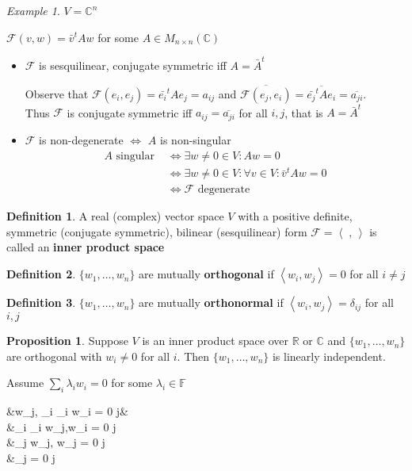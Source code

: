 \documentclass[11pt, a4paper]{report}
\makeatletter
\numberwithin{equation}{section}
\newcommand{\R}{\mathbb{R}}
\newcommand{\C}{\mathbb{C}}
\newcommand{\F}{\mathbb{F}}
\newcommand{\Fc}{\mathcal{F}}
\newcommand{\spn}[1]{\left\langle #1 \right\rangle}
\numberwithin{equation}{subsection}
\theoremstyle{plain}
\theoremstyle{definition}
\newtheorem{defn}{Definition}[chapter]
\newtheorem{prop}[thm]{Proposition}
\theoremstyle{remark}
\newtheorem{exmp}{Example}[chapter]
\newtheorem*{prf}{Proof}
\renewenvironment{prf}[1][\proofname]{\par
  \vspace{-\topsep}%
  \normalfont
  \topsep0pt \partopsep0pt %
  \trivlist
  \item[\hskip\labelsep
        \itshape
    #1\@addpunct{.}]\ignorespaces
}{%
  \popQED\endtrivlist\@endpefalse
  \addvspace{6pt plus 6pt} %
}
\newcommand{\pr}[1]{\begin{adjustwidth}{1cm}{} \begin{prf} #1 \end{prf} \end{adjustwidth}}
\makeatother
\begin{document}
\begin{exmp}
$V = \C^n$

$\Fc(v,w) = \bar{v}^tAw$ for some $A \in M_{n \times n}(\C)$
\begin{itemize}
\item $\Fc$ is sesquilinear, conjugate symmetric iff $A = \bar{A}^t$

Observe that $\Fc(e_i,e_j) = \bar{e_i}^t A e_j = a_{ij}$ and $\overline{\Fc(e_j,e_i)} = \overline{\bar{e_j}^t A e_i} = \overline{a_{ji}}$.\\ Thus $\Fc$ is conjugate symmetric iff $a_{ij} = \overline{a_{ji}}$ for all $i,j$, that is $A = \bar{A}^t$

\item $\Fc$ is non-degenerate $\iff$ $A$ is non-singular
\begin{align*}
A \text{ singular }	&\iff \exists w \neq 0 \in V : Aw = 0\\
					&\iff \exists w \neq 0 \in V : \forall v \in V : \bar{v}^tAw = 0\\
					&\iff \Fc \text{ degenerate }
\end{align*}
\end{itemize}
\end{exmp}

\begin{defn}
A real (complex) vector space $V$ with a positive definite, symmetric (conjugate symmetric), bilinear (sesquilinear) form $\Fc = \spn{\;,\,}$ is called an \textbf{inner product space}
\end{defn}

\begin{defn} 
$\{ w_1, \ldots, w_n \}$ are mutually \textbf{orthogonal} if $\spn{w_i,w_j} = 0$ for all $i \neq j$
\end{defn}

\begin{defn}
$\{ w_1, \ldots, w_n \}$ are mutually \textbf{orthonormal} if $\spn{w_i, w_j} = \delta_{ij}$ for all $i,j$
\end{defn}

\begin{prop}
Suppose $V$ is an inner product space over $\R$ or $\C$ and $\{ w_1, \ldots, w_n \}$ are orthogonal with $w_i \neq 0$ for all $i$. Then $\{ w_1, \ldots, w_n \}$ is linearly independent.

\pr{
Assume $\sum_i \lambda_i w_i = 0$ for some $\lambda_i \in \F$
\begin{flalign*}
&\Rightarrow \spn{w_j, \sum_i \lambda_i w_i} = 0 \hspace{24pt} \forall j&\\
&\Rightarrow \sum_i \lambda_i \spn{w_j,w_i} = 0 \hspace{30pt} \forall j\\
&\Rightarrow \lambda_j \spn{w_j, w_j} = 0 \hspace{45pt} \forall j\\
&\Rightarrow \lambda_j = 0 \hspace{83.5pt} \forall j
\end{flalign*}
}
\end{prop}
\end{document}
